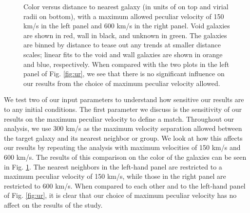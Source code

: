 \begin{figure}
    \caption[Sensitivity to peculiar velocity maximum]{Color versus distance to 
    nearest galaxy (in units of \hMpc on top and virial radii on bottom), with a 
    maximum allowed peculiar velocity of 150 km/s in the left panel and 600 km/s 
    in the right panel.  Void galaxies are shown in red, wall in black, and 
    unknown in green.  The galaxies are binned by distance to tease out any 
    trends at smaller distance scales; linear fits to the void and wall galaxies 
    are shown in orange and blue, respectively.  When compared with the two 
    plots in the left panel of Fig. \ref{fig:ur}, we see that there is no 
    significant influence on our results from the choice of maximum peculiar 
    velocity allowed.}
    \label{fig:ur_vpeculiar}
\end{figure}

We test two of our input parameters to understand how sensitive our results are 
to any initial conditions.  The first parameter we discuss is the sensitivity of 
our results on the maximum peculiar velocity to define a match.  Throughout our 
analysis, we use 300 km/s as the maximum velocity separation allowed between the 
target galaxy and its nearest neighbor or group.  We look at how this affects our 
results by repeating the analysis with maximum velocities of 150 km/s and 600 
km/s.  The results of this comparison on the color of the galaxies can be seen in 
Fig. \ref{fig:ur_vpeculiar}.  The nearest neighbors in the left-hand panel are 
restricted to a maximum peculiar velocity of 150 km/s, while those in the right 
panel are restricted to 600 km/s.  When compared to each other and to the 
left-hand panel of Fig. \ref{fig:ur}, it is clear that our choice of maximum 
peculiar velocity has no affect on the results of the study.


